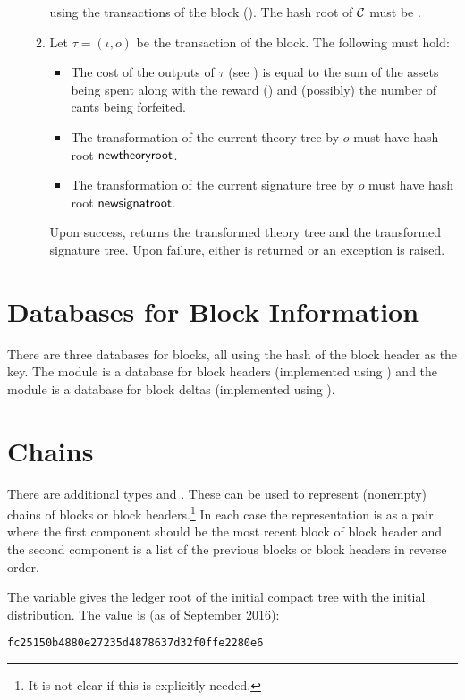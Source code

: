 \begin{itemize}
\begin{enumerate}
using the transactions of the block ({}).
The hash root of $\mathcal{C}$ must be {}.
\item Let $\tau=(\iota,o)$ be the transaction of the block. The following must hold:
\begin{itemize}
\item The cost of the outputs of $\tau$ (see {})
is equal to the sum of the assets being spent
along with the reward ({})
and (possibly) the number of cants being forfeited.
\item The transformation of the current theory tree by $o$ must have hash root $\field{newtheoryroot}$.
\item The transformation of the current signature tree by $o$ must have hash root $\field{newsignatroot}$.
\end{itemize}
Upon success, {} returns the transformed theory tree and the transformed signature tree.
Upon failure, either {} is returned or an exception is raised.
\end{enumerate}
\end{itemize}

\section{Databases for Block Information}

There are three databases for blocks, all using the hash of the block header as the key.
The module {} is a database for block headers (implemented using {})
and
the module {} is a database for block deltas (implemented using {}).

\section{Chains}

There are additional types
{}
and 
{}.
These can be used to represent (nonempty) chains of blocks or block headers.\footnote{It is not clear if this is explicitly needed.}
In each case the representation is as a pair
where the first component should be the most recent block of block header
and the second component is a list of the previous blocks or block headers
in reverse order.

The variable {} gives the ledger root of the initial compact tree
with the initial distribution. The value is (as of September 2016):
\begin{verbatim}
fc25150b4880e27235d4878637d32f0ffe2280e6
\end{verbatim}

